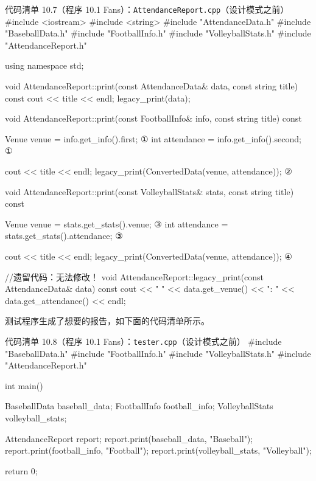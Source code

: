 \begin{codeboxt}{代码清单 10.7（程序 10.1 Fans）：\texttt{Attendance\allowbreak{}Report.\allowbreak{}cpp}（设计模式之前）}
#include <iostream>
#include <string>
#include "AttendanceData.h"
#include "BaseballData.h"
#include "FootballInfo.h"
#include "VolleyballStats.h"
#include "AttendanceReport.h"

using namespace std;

void AttendanceReport::print(const AttendanceData& data,
                             const string title) const
{
    cout << title << endl;
    legacy_print(data);
}

void AttendanceReport::print(const FootballInfo& info,
                             const string title) const
{
    Venue venue      = info.get_info().first;          ①
    int   attendance = info.get_info().second;         ①

    cout << title << endl;
    legacy_print(ConvertedData(venue, attendance));    ②
}

void AttendanceReport::print(const VolleyballStats& stats,
                             const string title) const
{
    Venue venue      = stats.get_stats().venue;        ③
    int   attendance = stats.get_stats().attendance;   ③

    cout << title << endl;
    legacy_print(ConvertedData(venue, attendance));    ④
}

//遗留代码：无法修改！
void AttendanceReport::legacy_print(const AttendanceData& data) const
{
    cout << "  " << data.get_venue()
         << ": " << data.get_attendance() << endl;
}
\end{codeboxt}
\par
{}\par
{}\par
{}\par


测试程序生成了想要的报告，如下面的代码清单所示。

\begin{codeboxt}{代码清单 10.8（程序 10.1 Fans）：\texttt{tester.\allowbreak{}cpp}（设计模式之前）}
#include "BaseballData.h"
#include "FootballInfo.h"
#include "VolleyballStats.h"
#include "AttendanceReport.h"

int main()
{
    BaseballData    baseball_data;
    FootballInfo    football_info;
    VolleyballStats volleyball_stats;

    AttendanceReport report;
    report.print(baseball_data,    "Baseball");
    report.print(football_info,    "Football");
    report.print(volleyball_stats, "Volleyball");

    return 0;
}
\end{codeboxt}

